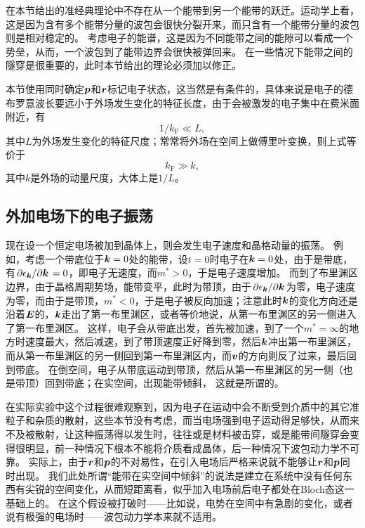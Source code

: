 在本节给出的准经典理论中不存在从一个能带到另一个能带的跃迁。运动学上看，这是因为含有多个能带分量的波包会很快分裂开来，而只含有一个能带分量的波包则是相对稳定的。
考虑电子的能谱，这是因为不同能带之间的能隙可以看成一个势垒，从而，一个波包到了能带边界会很快被弹回来。
在一些情况下能带之间的隧穿是很重要的，此时本节给出的理论必须加以修正。

本节使用同时确定$\vb*{p}$和$\vb*{r}$标记电子状态，这当然是有条件的，具体来说是电子的德布罗意波长要远小于外场发生变化的特征长度，由于会被激发的电子集中在费米面附近，有
\begin{equation}
    1 / k_\text{F} \ll L,
\end{equation}
其中$L$为外场发生变化的特征尺度；常常将外场在空间上做傅里叶变换，则上式等价于
\begin{equation}
    k_\text{F} \gg k,
\end{equation}
其中$k$是外场的动量尺度，大体上是$1/L$。

\subsection{外加电场下的电子振荡}

现在设一个恒定电场被加到晶体上，则会发生电子速度和晶格动量的振荡。
例如，考虑一个带底位于$\vb*{k}=0$处的能带，设$t=0$时电子在$\vb*{k}=0$处，由于是带底，有$\pdv*{\epsilon_{\vb*{k}}}{\vb*{k}} = 0$，即电子无速度，而$m^* > 0$，于是电子速度增加。
而到了布里渊区边界，由于晶格周期势场，能带变平，此时为带顶，由于$\pdv*{\epsilon_{\vb*{k}}}{\vb*{k}}$为零，电子速度为零，而由于是带顶，$m^* < 0$，于是电子被反向加速；注意此时$\vb*{k}$的变化方向还是沿着$\vb*{E}$的，$\vb*{k}$走出了第一布里渊区，或者等价地说，从第一布里渊区的另一侧进入了第一布里渊区。
这样，电子会从带底出发，首先被加速，到了一个$m^* = \infty$的地方时速度最大，然后减速，到了带顶速度正好降到零，然后$\vb*{k}$冲出第一布里渊区，而从第一布里渊区的另一侧回到第一布里渊区内，而$\vb*{v}$的方向则反了过来，最后回到带底。
在倒空间，电子从带底运动到带顶，然后从第一布里渊区的另一侧（也是带顶）回到带底；在实空间，出现能带倾斜，%
这就是所谓的。

在实际实验中这个过程很难观察到，因为电子在运动中会不断受到介质中的其它准粒子和杂质的散射，这些本节没有考虑，而当电场强到电子运动得足够快，从而来不及被散射，让这种振荡得以发生时，往往或是材料被击穿，或是能带间隧穿会变得很明显，前一种情况下根本不能将介质看成晶体，后一种情况下波包动力学不可靠。
实际上，由于$\vb*{r}$和$\vb*{p}$的不对易性，在引入电场后严格来说就不能够让$\vb*{r}$和$\vb*{p}$同时出现。
我们此处所谓“能带在实空间中倾斜”的说法是建立在系统中没有任何东西有尖锐的空间变化，从而短距离看，似乎加入电场前后电子都处在Bloch态这一基础上的。
在这个假设被打破时——比如说，电势在空间中有急剧的变化，或者说有极强的电场时——波包动力学本来就不适用。

